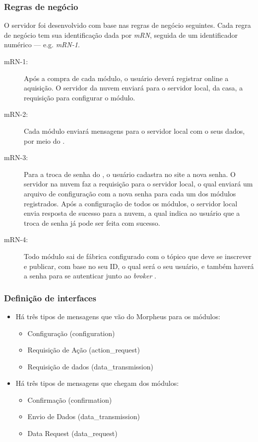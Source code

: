 \subsubsection{Regras de negócio}
O servidor foi desenvolvido com base nas regras de negócio seguintes. Cada regra de negócio tem sua identificação dada por \emph{mRN}, seguida de um identificador numérico --- e.g. \emph{mRN-1}.
\begin{description}
\item[mRN-1:]Após a compra de cada módulo, o usuário deverá registrar online a aquisição. O servidor da nuvem enviará para o servidor local, da casa, a requisição para configurar o módulo.
\item[mRN-2:]Cada módulo enviará mensagens para o servidor local com o seus dados, por meio do \wmqtt{}.
\item[mRN-3:]Para a troca de senha do \wwifi, o usuário cadastra no site a nova senha. O servidor na nuvem faz a requisição para o servidor local, o qual enviará um arquivo de configuração com a nova senha para cada um dos módulos registrados. Após a configuração de todos os módulos, o servidor local envia resposta de sucesso para a nuvem, a qual indica ao usuário que a troca de senha já pode ser feita com sucesso.
\item[mRN-4:]Todo módulo sai de fábrica configurado com o tópico que deve se inscrever e publicar, com base no seu ID, o qual será o seu usuário, e também haverá a senha para se autenticar junto ao \emph{broker} \wmqtt{}.
\end{description}

\subsubsection{Definição de interfaces}
\begin{itemize}
\item Há três tipos de mensagens que vão do Morpheus para os módulos:
  \begin{itemize}
  \item Configuração (configuration)
  \item Requisição de Ação (action\_request)
  \item Requisição de dados (data\_transmission)
  \end{itemize}
\item Há três tipos de mensagens que chegam dos módulos:
  \begin{itemize}
  \item Confirmação (confirmation)
  \item Envio de Dados (data\_transmission)
  \item Data Request (data\_request)
  \end{itemize}
\end{itemize}

